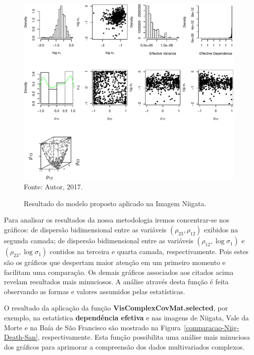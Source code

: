 \documentclass[journal]{IEEEtran}
\begin{document}
\newpage

\begin{figure}[h]
\centering
\caption{Resultado do modelo proposto aplicado na Imagem Niigata.}
\includegraphics[width=\linewidth]{../../Figuras/Amostras-Niigata/Niigata-Amarela-500.pdf}\\
Fonte: Autor, 2017.
\label{grafico-geral}
\end{figure}  

Para analisar os resultados da nossa metodologia iremos concentrar-se nos gráficos: de dispersão bidimensional entre as variáveis $(\rho_{23}, \rho_{12})$ exibidos na segunda camada; de dispersão bidimensional entre as variáveis $(\rho_{12},\log\sigma_{1})$ e $(\rho_{23},\log\sigma_{1})$ contidos na terceira e quarta camada, respectivamente. Pois estes são os gráficos que despertam maior atenção em um primeiro momento e facilitam uma comparação. Os demais gráficos associados aos citados acima revelam resultados mais minuciosos. A análise através desta função é feita observando as formas e valores assumidos pelas estatísticas.   

O resultado da aplicação da função \textbf{VisComplexCovMat.selected}, por exemplo, na estatística \textbf{dependência efetiva} e nas imagens de Niigata, Vale da Morte e na Baía de São Francisco são mostrado na Figura~\ref{comparacao-Niig-Death-San}, respectivamente. Esta função possibilita uma análise mais minuciosa dos gráficos para aprimorar a compreensão dos dados multivariados complexos.  
\end{document}
